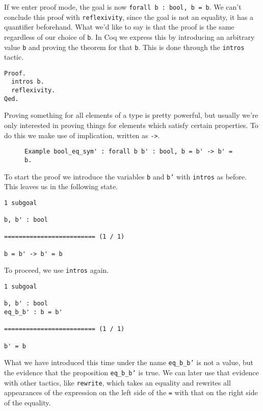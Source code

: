If we enter proof mode, the goal is now \texttt{forall b : bool, b = b}. We can't conclude this
proof with \texttt{reflexivity}, since the goal is not an equality, it has a quantifier 
beforehand. What we'd like to say is that the proof is the same regardless of our choice of 
\texttt{b}. In Coq we express this by introducing an arbitrary value \texttt{b} and
proving the theorem for that \texttt{b}. This is done through the \texttt{intros} 
tactic.

\begin{verbatim}
Proof.
  intros b.
  reflexivity.
Qed.
\end{verbatim}

Proving something for all elements of a type is pretty powerful, but usually we're only interested in
proving things for elements which satisfy certain properties. To do this we make use of implication,
written as \texttt{->}.
\begin{figure}[!ht]
\begin{verbatim}
Example bool_eq_sym' : forall b b' : bool, b = b' -> b' = b.
\end{verbatim}
\label{lst:bool-eq-sym}
\end{figure}

To start the proof we introduce the variables \texttt{b} and \texttt{b'} with 
\texttt{intros} as before. This leaves us in the following state.

\begin{verbatim}
1 subgoal

b, b' : bool

========================= (1 / 1)

b = b' -> b' = b
\end{verbatim}

To proceed, we use \texttt{intros} again.

\begin{verbatim}
1 subgoal

b, b' : bool
eq_b_b' : b = b'

========================= (1 / 1)

b' = b
\end{verbatim}

What we have introduced this time under the name \texttt{eq_b_b'} is not a value, but the
evidence that the proposition \texttt{eq_b_b'} is true. We can later use that evidence with
other tactics, like \texttt{rewrite}, which takes an equality and rewrites all appearances of
the expression on the left side of the \texttt{=} with that on the right side of the equality.

